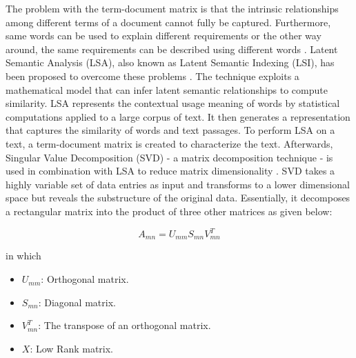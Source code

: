 The problem with the term-document matrix is that the intrinsic relationships among different terms of a document cannot fully be captured. Furthermore, same words can be used to explain different requirements or the other way around, the same requirements can be described using different words \cite{10.1109/APSEC.2004.69}. Latent Semantic Analysis (LSA), also known as Latent Semantic Indexing (LSI), has been proposed to overcome these problems \cite{Landauer1998}. The technique exploits a mathematical model that can infer latent semantic relationships to compute similarity. LSA represents the contextual usage meaning of words by statistical computations applied to a large corpus of text. It then generates a representation that captures the similarity of words and text passages. To perform LSA on a text, a term-document matrix is created to characterize the text. Afterwards, Singular Value Decomposition (SVD) - a matrix decomposition technique - is used in combination with LSA to reduce matrix dimensionality \cite{kb2005}. SVD takes a highly variable set of data entries as input and transforms to a lower dimensional space but reveals the substructure of the original data. Essentially, it decomposes a rectangular matrix into the product of three other matrices as given below\cite{kb2005}:

\begin{equation}
A_{mn}=U_{mm}S_{mn}V_{mn}^{T}
\end{equation}

in which

\begin{itemize}
	\item $U_{mm}$: Orthogonal matrix.
	\item $S_{mn}$: Diagonal matrix.
	\item $V_{mn}^{T}$: The transpose of an orthogonal matrix.
	\item $X$: Low Rank matrix.
\end{itemize}


